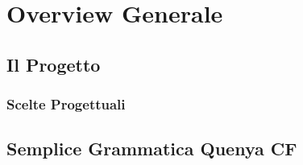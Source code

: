 \chapter{Overview Generale}

\section{Il Progetto}

\subsection{Scelte Progettuali}

\section{Semplice Grammatica Quenya CF}
